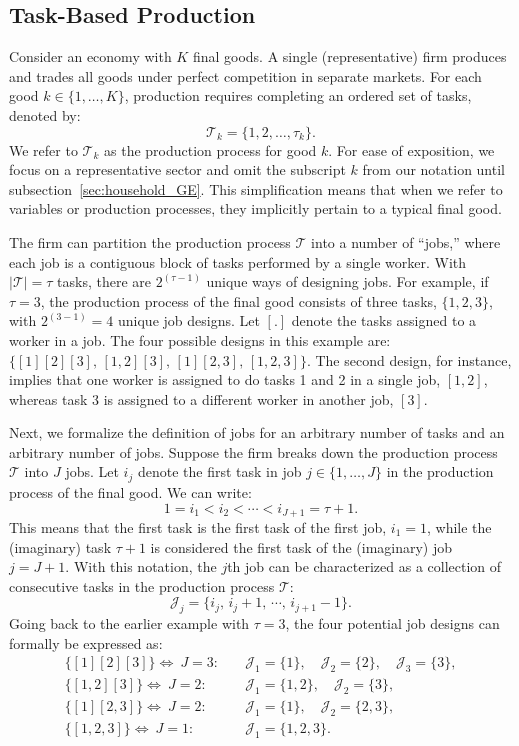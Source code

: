 \documentclass{article}
\theoremstyle{plain}
\theoremstyle{plain}
\begin{document}
\subsection{Task-Based Production}
Consider an economy with $K$ final goods.
A single (representative) firm produces and trades all goods under perfect competition in separate markets.
For each good $k \in \{1,\ldots,K\}$, production requires completing an ordered set of tasks, denoted by:
\[
\mathcal{T}_k = \{1,2,\ldots,\tau_k\}.
\]
We refer to $\mathcal{T}_k$ as the production process for good $k$.
For ease of exposition, we focus on a representative sector and omit the subscript $k$ from our notation until subsection~\ref{sec:household_GE}.
This simplification means that when we refer to variables or production processes, they implicitly pertain to a typical final good.

The firm can partition the production process $\mathcal{T}$ into a number of ``jobs,'' where each job is a contiguous block of tasks performed by a single worker.
With $|\mathcal{T}| = \tau$ tasks, there are $2^{(\tau - 1)}$ unique ways of designing jobs.
For example, if $\tau = 3$, the production process of the final good consists of three tasks, $\{1,2,3\}$, with $2^{(3-1)}=4$ unique job designs.
Let $[.]$ denote the tasks assigned to a worker in a job.
The four possible designs in this example are: $\{[1][2][3], \, [1,2][3], \, [1][2,3], \, [1,2,3]\}$.
The second design, for instance, implies that one worker is assigned to do tasks 1 and 2 in a single job, $[1,2]$, whereas task 3 is assigned to a different worker in another job, $[3]$.

Next, we formalize the definition of jobs for an arbitrary number of tasks and an arbitrary number of jobs.
Suppose the firm breaks down the production process $\mathcal{T}$ into $J$ jobs.
Let $i_j$ denote the first task in job $j \in \{1,\ldots,J\}$ in the production process of the final good.
We can write:
\[
1 = i_1 < i_2 < \cdots < i_{J+1} = \tau+1.
\]
This means that the first task is the first task of the first job, $i_1=1$, while the (imaginary) task $\tau+1$ is considered the first task of the (imaginary) job $j = J+1$.
With this notation, the $j$th job can be characterized as a collection of consecutive tasks in the production process $\mathcal{T}$:
\[
\mathcal{J}_j = \{i_j, \, i_j+1, \, \cdots, \, i_{j+1} - 1\}.
\]
Going back to the earlier example with $\tau=3$, the four potential job designs can formally be expressed as:
\begin{align*}
\{[1][2][3]\} \Longleftrightarrow \ J = 3:  & \quad \mathcal{J}_1 = \{1\}, \quad  \mathcal{J}_2 = \{2\}, \quad \mathcal{J}_3 = \{3\}, \\
\{[1,2][3]\} \Longleftrightarrow \ J = 2: & \quad \mathcal{J}_1 = \{1, 2\},  \quad \mathcal{J}_2 = \{3\}, \\
\{[1][2,3]\} \Longleftrightarrow \ J = 2: & \quad \mathcal{J}_1 = \{1\}, \quad \mathcal{J}_2 = \{2, 3\}, \\
\{[1,2,3]\} \Longleftrightarrow \ J = 1: & \quad \mathcal{J}_1 = \{1,2,3\}.
\end{align*}
\end{document}
